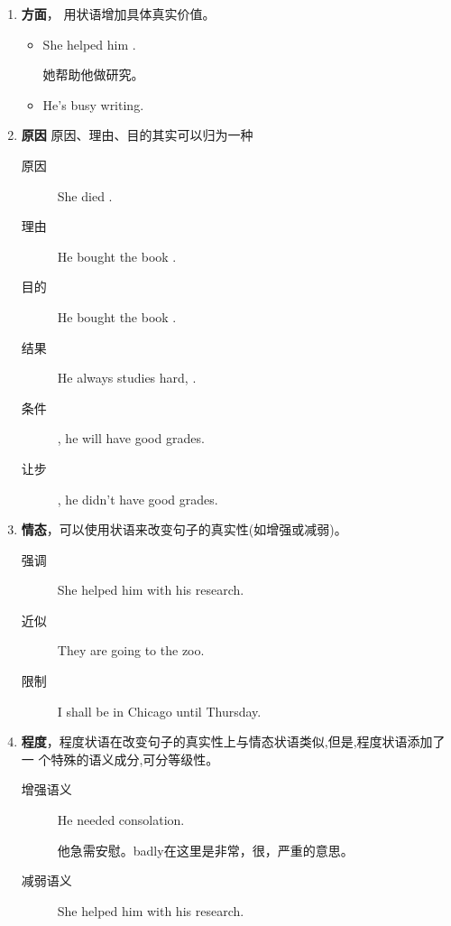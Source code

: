 \begin{enumerate}
\item \textbf{方面}， 用状语增加具体真实价值。
  \begin{itemize}
  \item She helped him .

    她帮助他做研究。
  \item He's busy writing.
  \end{itemize}
\item \textbf{原因} 原因、理由、目的其实可以归为一种
  \begin{description}
  \item[原因] She died .
  \item[理由] He bought the book .
  \item[目的] He bought the book .
  \item[结果] He always studies hard, .
  \item[条件] , he will have good grades.
  \item[让步] , he didn't have good grades.
  \end{description}

\item \textbf{情态}，可以使用状语来改变句子的真实性(如增强或减弱)。
  \begin{description}
  \item[强调] She  helped him with his research.

  \item[近似] They are  going to the zoo.

  \item[限制] I shall be in Chicago  until Thursday.
  \end{description}

\item \textbf{程度}，程度状语在改变句子的真实性上与情态状语类似,但是,程度状语添加了一
  个特殊的语义成分,可分等级性。
  \begin{description}
  \item[增强语义] He  needed consolation.

    他急需安慰。badly在这里是非常，很，严重的意思。

  \item[减弱语义] She helped him  with his research.
  \end{description}
\end{enumerate}

